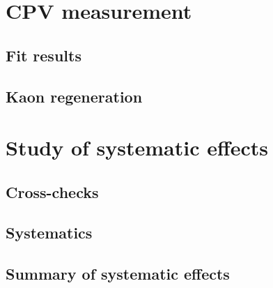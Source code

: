 \section{CPV measurement}
\subsection{Fit results}
\subsection{Kaon regeneration}
\section{Study of systematic effects}
\subsection{Cross-checks}
\subsection{Systematics}
\subsection{Summary of systematic effects}
